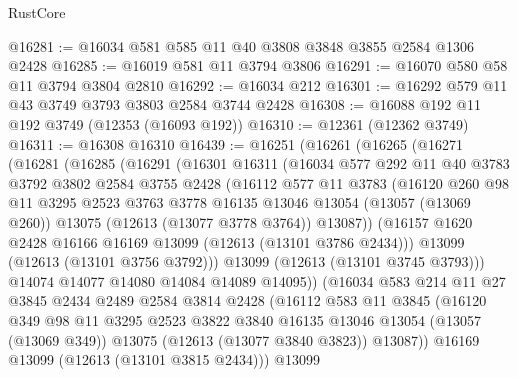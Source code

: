 \begin{lexlean}{RustCore}
\begin{coremodule}
@16281 := @16034 @581 @585 @11 @40 @3808 @3848 @3855 @2584 @1306 @2428
@16285 := @16019 @581 @11 @3794 @3806
@16291 := @16070 @580 @58 @11 @3794 @3804 @2810
@16292 := @16034 @212
@16301 := @16292 @579 @11 @43 @3749 @3793 @3803 @2584 @3744 @2428
@16308 := @16088 @192 @11 @192 @3749 (@12353 (@16093 @192))
@16310 := @12361 (@12362 @3749)
@16311 := @16308 @16310
@16439 := @16251
    (@16261
      (@16265
        (@16271
          (@16281
            (@16285
              (@16291
                (@16301
                  @16311
                  (@16034
                    @577
                    @292
                    @11
                    @40
                    @3783
                    @3792
                    @3802
                    @2584
                    @3755
                    @2428
                    (@16112
                      @577
                      @11
                      @3783
                      (@16120
                        @260
                        @98
                        @11
                        @3295
                        @2523
                        @3763
                        @3778
                        @16135
                        @13046
                        @13054
                        (@13057 (@13069 @260))
                        @13075
                        (@12613 (@13077 @3778 @3764))
                        @13087))
                    (@16157 @1620 @2428 @16166 @16169 @13099 (@12613 (@13101 @3786 @2434)))
                    @13099
                    (@12613 (@13101 @3756 @3792)))
                  @13099
                  (@12613 (@13101 @3745 @3793)))
                @14074
                @14077
                @14080
                @14084
                @14089
                @14095))
            (@16034
              @583
              @214
              @11
              @27
              @3845
              @2434
              @2489
              @2584
              @3814
              @2428
              (@16112
                @583
                @11
                @3845
                (@16120
                  @349
                  @98
                  @11
                  @3295
                  @2523
                  @3822
                  @3840
                  @16135
                  @13046
                  @13054
                  (@13057 (@13069 @349))
                  @13075
                  (@12613 (@13077 @3840 @3823))
                  @13087))
              @16169
              @13099
              (@12613 (@13101 @3815 @2434)))
            @13099

\end{coremodule}
\end{lexlean}
